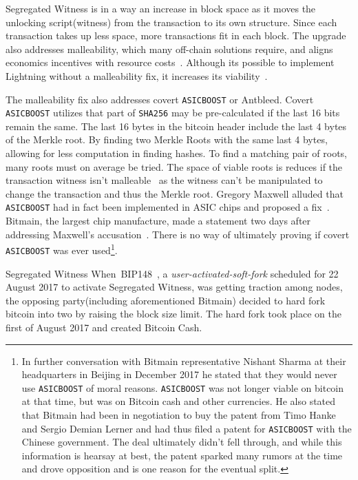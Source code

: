 Segregated Witness is in a way an increase in block space as it moves the unlocking script(witness) from the transaction to its own structure. Since each transaction takes up less space, more transactions fit in each block. The upgrade also addresses malleability, which many off-chain solutions require, and aligns economics incentives with resource costs~\cite{antonopoulos:segregated:witness:align:economic:incentives}. Although its possible to implement Lightning without a malleability fix, it increases its viability~\cite{song:lightning:malleability}.

The malleability fix also addresses covert \texttt{ASICBOOST} or Antbleed. Covert \texttt{ASICBOOST} utilizes that part of \texttt{SHA256} may be pre-calculated if the last 16 bits remain the same. The last 16 bytes in the bitcoin header include the last 4 bytes of the Merkle root. By finding two Merkle Roots with the same last 4 bytes, allowing for less computation in finding \gls{hash}es. To find a matching pair of roots, many roots must on average be tried. The space of viable roots is reduces if the transaction witness isn't malleable~\cite{song:asicboost} as the witness can't be manipulated to change the transaction and thus the Merkle root. Gregory Maxwell alluded that \texttt{ASICBOOST} had in fact been implemented in ASIC chips and proposed a fix~\cite{maxwell:asicboost:fix}. Bitmain, the largest chip manufacture, made a statement two days after addressing Maxwell's accusation~\cite{bitmain:response}. There is no way of ultimately proving if covert \texttt{ASICBOOST} was ever used\footnote{In further conversation with Bitmain representative Nishant Sharma at their headquarters in Beijing in December 2017 he stated that they would never use \texttt{ASICBOOST} of moral reasons. \texttt{ASICBOOST} was not longer viable on \gls{bitcoin} at that time, but was on Bitcoin cash and other currencies. He also stated that Bitmain had been in negotiation to buy the patent from Timo Hanke and Sergio Demian Lerner and had thus filed a patent for \texttt{ASICBOOST} with the Chinese government. The deal ultimately didn't fell through, and while this information is hearsay at best, the patent sparked many rumors at the time and drove opposition and is one reason for the eventual split.}. 

Segregated Witness When~BIP148~\cite{bip:148:uasf:segwit}, a \textit{user-activated-soft-fork} scheduled for 22 August 2017 to activate Segregated Witness, was getting traction among \gls{node}s, the opposing party(including aforementioned Bitmain) decided to hard fork bitcoin into two by raising the block size limit. The hard fork took place on the first of August 2017 and created Bitcoin Cash.

